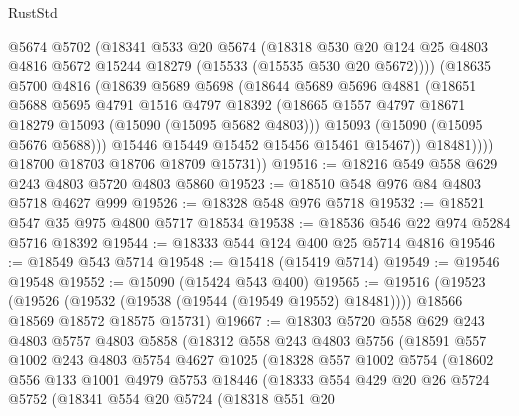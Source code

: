 \begin{lexlean}{RustStd}
\begin{coremodule}
              @5674
              @5702
              (@18341
                @533
                @20
                @5674
                (@18318
                  @530
                  @20
                  @124
                  @25
                  @4803
                  @4816
                  @5672
                  @15244
                  @18279
                  (@15533 (@15535 @530 @20 @5672))))
              (@18635
                @5700
                @4816
                (@18639
                  @5689
                  @5698
                  (@18644
                    @5689
                    @5696
                    @4881
                    (@18651
                      @5688
                      @5695
                      @4791
                      @1516
                      @4797
                      @18392
                      (@18665 @1557 @4797 @18671 @18279 @15093 (@15090 (@15095 @5682 @4803)))
                      @15093
                      (@15090 (@15095 @5676 @5688)))
                    @15446
                    @15449
                    @15452
                    @15456
                    @15461
                    @15467))
                @18481))))
        @18700
        @18703
        @18706
        @18709
        @15731))
@19516 := @18216 @549 @558 @629 @243 @4803 @5720 @4803 @5860
@19523 := @18510 @548 @976 @84 @4803 @5718 @4627 @999
@19526 := @18328 @548 @976 @5718
@19532 := @18521 @547 @35 @975 @4800 @5717 @18534
@19538 := @18536 @546 @22 @974 @5284 @5716 @18392
@19544 := @18333 @544 @124 @400 @25 @5714 @4816
@19546 := @18549 @543 @5714
@19548 := @15418 (@15419 @5714)
@19549 := @19546 @19548
@19552 := @15090 (@15424 @543 @400)
@19565 := @19516
    (@19523
      (@19526 (@19532 (@19538 (@19544 (@19549 @19552) @18481))))
      @18566
      @18569
      @18572
      @18575
      @15731)
@19667 := @18303
    @5720
    @558
    @629
    @243
    @4803
    @5757
    @4803
    @5858
    (@18312
      @558
      @243
      @4803
      @5756
      (@18591
        @557
        @1002
        @243
        @4803
        @5754
        @4627
        @1025
        (@18328
          @557
          @1002
          @5754
          (@18602
            @556
            @133
            @1001
            @4979
            @5753
            @18446
            (@18333
              @554
              @429
              @20
              @26
              @5724
              @5752
              (@18341
                @554
                @20
                @5724
                (@18318
                  @551
                  @20

\end{coremodule}
\end{lexlean}
